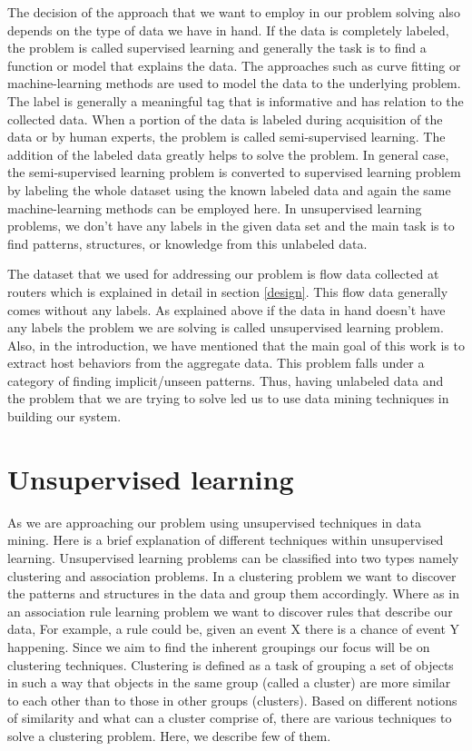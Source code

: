 The decision of the approach that we want to employ in our problem solving also depends on the type of data we have in hand. If the data is completely labeled, the problem is called supervised learning and generally the task is to find a function or model that explains the data. The approaches such as curve fitting or machine-learning methods are used to model the data to the underlying problem. The label is generally a meaningful tag that is informative and has relation to the collected data.  When a portion of the data is labeled during acquisition of the data or by human experts, the problem is called semi-supervised learning. The addition of the labeled data greatly helps to solve the problem. In general case, the semi-supervised learning problem is converted to supervised learning problem by labeling the whole dataset using the known labeled data and again the same machine-learning methods can be employed here. In unsupervised learning problems, we don't have any labels in the given data set and the main task is to find patterns, structures, or knowledge from this unlabeled data.   

The dataset that we used for addressing our problem is flow data collected at routers which is explained in detail in section \ref{design}. This flow data generally comes without any labels. As explained above if the data in hand doesn't have any labels the problem we are solving is called unsupervised learning problem. Also, in the introduction, we have mentioned that the main goal of this work is to extract host behaviors from the aggregate data. This problem falls under a category of finding implicit/unseen patterns. Thus, having unlabeled data and the problem that we are trying to solve led us to use data mining techniques in building our system.

\section{Unsupervised learning}  \label{unsupervised}
As we are approaching our problem using unsupervised techniques in data mining. Here is a brief explanation of different techniques within unsupervised learning. Unsupervised learning problems can be classified into two types namely clustering and association problems. In a clustering problem we want to discover the patterns and structures in the data and group them accordingly. Where as in an association rule learning problem we want to discover rules that describe our data, For example, a rule could be, given an event X there is a chance of event Y happening. Since we aim to find the inherent groupings our focus will be on clustering techniques. Clustering is defined as a task of grouping a set of objects in such a way that objects in the same group (called a cluster) are more similar to each other than to those in other groups (clusters). Based on different notions of similarity and what can a cluster comprise of, there are various techniques to solve a clustering problem. Here, we describe few of them.

